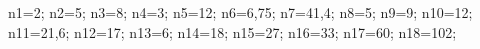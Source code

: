 \documentclass[exercice]{thedocument}%
\begin{document}
%
    \>n1=2;%
    \>n2=5;%
    \>n3=8;%
    \>n4=3;%
    \>n5=12;%
    \>n6=6,75;%
    \>n7=41,4;%
    \>n8=5;%
    \>n9=9;%
    \>n10=12;%
    \>n11=21,6;%
    \>n12=17;%
    \>n13=6;%
    \>n14=18;%
    \>n15=27;%
    \>n16=33;%
    \>n17=60;%
    \>n18=102;%
\end{document}
